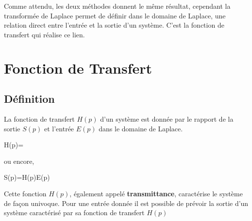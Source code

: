 Comme attendu, les deux méthodes donnent le même résultat, cependant 
la transformée de Laplace permet de définir dans le domaine de Laplace, une 
relation direct entre l'entrée et la sortie d'un système. C'est la fonction 
de transfert qui réalise ce lien.

\section{Fonction de Transfert}

\subsection{Définition}

La fonction de transfert $H(p)$ d'un système est donnée par le rapport de la 
sortie $S(p)$ et l'entrée $E(p)$ dans le domaine de Laplace. 
\begin{bequation}
H(p)=
\end{bequation}
ou encore,
\begin{bequation}
    S(p)=H(p)E(p)\label{eq-she}
\end{bequation}

Cette fonction $H(p)$, également appelé \textbf{transmittance}, caractérise 
le système de façon univoque. Pour une entrée donnée il est possible de 
prévoir la sortie d'un système caractérisé par sa fonction de transfert $H(p)$

